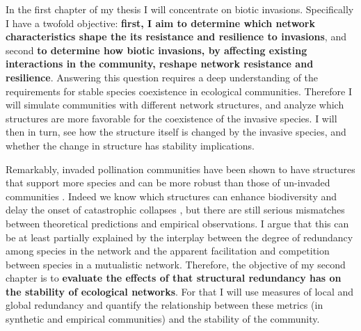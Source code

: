 \documentclass[a4paper]{article}
\begin{document}
In the first chapter of my thesis I will concentrate on biotic invasions.
Specifically I have a twofold objective: \textbf{first, I aim to determine which network characteristics shape the its resistance and resilience to invasions}, and second \textbf{to determine how biotic invasions, by affecting existing interactions in the community, reshape network resistance and resilience}.
Answering this question requires a deep understanding of the requirements for stable species coexistence in ecological communities.
Therefore I will simulate communities with different network structures, and analyze which structures are more favorable for the coexistence of the invasive species.
I will then in turn, see how the structure itself is changed by the invasive species, and whether the change in structure has stability implications.

Remarkably, invaded pollination communities have been shown to have structures that support more species \autocite{Stouffer2014} and can be more robust than those of un-invaded communities \autocite{Albrecht2014}.
Indeed we know which structures can enhance biodiversity \autocite{Bastolla2009} and delay the onset of catastrophic collapses \autocite{Lever2014}, but there are still serious mismatches between theoretical predictions and empirical observations.
I argue that this can be at least partially explained by the interplay between the degree of redundancy among species in the network and the apparent facilitation and competition between species in a mutualistic network.
Therefore, the objective of my second chapter is to \textbf{evaluate the effects of that structural redundancy has on the stability of ecological networks}.
For that I will use measures of local and global redundancy and quantify the relationship between these metrics (in synthetic and empirical communities) and the stability of the community.
\end{document}
